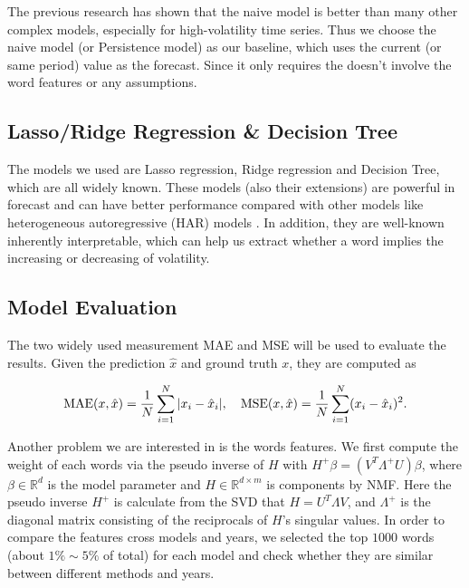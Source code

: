\documentclass[11pt]{article}
\begin{document}
The previous research \cite{beck2025mind} has shown that the naive model is better than many other complex models, especially for high-volatility time series. Thus we choose the naive model (or Persistence model) as our baseline, which uses the current (or same period) value as the forecast. Since it only requires the  doesn't involve the word features or any assumptions.

\subsection{Lasso/Ridge Regression \& Decision Tree}

The models we used are Lasso regression, Ridge regression and Decision Tree, which are all widely known. These models (also their extensions) are powerful in forecast and can have better performance compared with other models like heterogeneous autoregressive (HAR) models \cite{liang2023forecasting} \cite{li2022forecasting} \cite{christensen2023machine}. In addition, they are well-known inherently interpretable, which can help us extract whether a word implies the increasing or decreasing of volatility.

\subsection{Model Evaluation}

The two widely used measurement MAE and MSE will be used to evaluate the results. Given the prediction $\hat{x}$ and ground truth $x$, they are computed as

$$
  \text{MAE}(x, \hat{x}) = \frac{1}{N} \sum_{i=1}^N \vert x_i - \hat{x}_i \vert,\quad \text{MSE}(x, \hat{x}) = \frac{1}{N} \sum_{i=1}^N  (x_i - \hat{x}_i)^2. \\
$$

Another problem we are interested in is the words features. We first compute the weight of each words via the pseudo inverse of $H$ with $H^+ \beta = (V^T \Lambda^+ U) \beta$, where $\beta \in \mathbb{R}^d$ is the model parameter and $H \in \mathbb{R}^{d \times m}$ is components by NMF. Here the pseudo inverse $H^+$ is calculate from the SVD that $H = U^T \Lambda V$, and $\Lambda^+$ is the diagonal matrix consisting of the reciprocals of $H$'s singular values. In order to compare the features cross models and years, we selected the top $1000$ words (about $1\% \sim 5\%$ of total) for each model and check whether they are similar between different methods and years.
\end{document}
